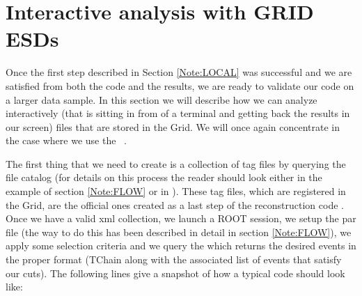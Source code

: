\section{Interactive analysis with GRID ESDs}
\label{Note:INTERACTIVE}

Once the first step described in Section \ref{Note:LOCAL} was successful and we are satisfied from both the code and the results, we are ready to validate our code on a larger data sample. In this section we will describe how we can analyze interactively (that is sitting in from of a terminal and getting back the results in our screen) files that are stored in the Grid. We will once again concentrate in the case where we use the \tag\ \cite{Note:RefAlienTutorial,Note:RefEventTagWeb}.

The first thing that we need to create is a collection of tag files by querying the file catalog (for details on this process the reader should look either in the example of section \ref{Note:FLOW} or in \cite{Note:RefFileCatalogMetadataNote,Note:RefFileCatalogMetadataWeb}). These tag files, which are registered in the Grid, are the official ones created as a last step of the reconstruction code \cite{Note:RefEventTagNote}. Once we have a valid xml collection, we launch a ROOT session, we setup the {\ttfamily par file} (the way to do this has been described in detail in section \ref{Note:FLOW}), we apply some selection criteria and we query the \tag which returns the desired events in the proper format (TChain along with the associated list of events that satisfy our cuts). The following lines give a snapshot of how a typical code should look like:


